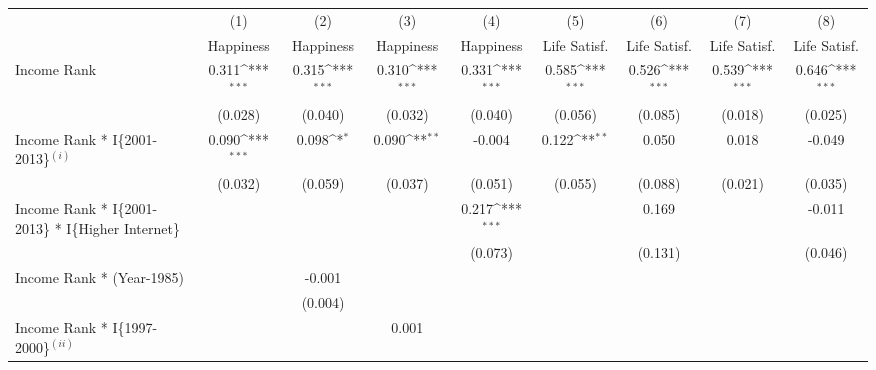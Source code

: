 \begin{table}[htb]
\resizebox{\textwidth}{!}
{
\def\sym#1{\ifmmode^{#1}\else\(^{#1}\)\fi}
\begin{tabular}{l*{8}{c}}
\toprule
                &\multicolumn{1}{c}{(1)}&\multicolumn{1}{c}{(2)}&\multicolumn{1}{c}{(3)}&\multicolumn{1}{c}{(4)}&\multicolumn{1}{c}{(5)}&\multicolumn{1}{c}{(6)}&\multicolumn{1}{c}{(7)}&\multicolumn{1}{c}{(8)}\\
                &\multicolumn{1}{c}{Happiness}&\multicolumn{1}{c}{Happiness}&\multicolumn{1}{c}{Happiness}&\multicolumn{1}{c}{Happiness}&\multicolumn{1}{c}{Life Satisf.}&\multicolumn{1}{c}{Life Satisf.}&\multicolumn{1}{c}{Life Satisf.}&\multicolumn{1}{c}{Life Satisf.}\\
\midrule
Income Rank     &    0.311\sym{***}&    0.315\sym{***}&    0.310\sym{***}&    0.331\sym{***}&    0.585\sym{***}&    0.526\sym{***}&    0.539\sym{***}&    0.646\sym{***}\\
                &  (0.028)         &  (0.040)         &  (0.032)         &  (0.040)         &  (0.056)         &  (0.085)         &  (0.018)         &  (0.025)         \\
Income Rank * I\{2001-2013\}$^{(i)}$&    0.090\sym{***}&    0.098\sym{*}  &    0.090\sym{**} &   -0.004         &    0.122\sym{**} &    0.050         &    0.018         &   -0.049         \\
                &  (0.032)         &  (0.059)         &  (0.037)         &  (0.051)         &  (0.055)         &  (0.088)         &  (0.021)         &  (0.035)         \\
Income Rank * I\{2001-2013\} * I\{Higher Internet\}&                  &                  &                  &    0.217\sym{***}&                  &    0.169         &                  &   -0.011         \\
                &                  &                  &                  &  (0.073)         &                  &  (0.131)         &                  &  (0.046)         \\
Income Rank * (Year-1985)&                  &   -0.001         &                  &                  &                  &                  &                  &                  \\
                &                  &  (0.004)         &                  &                  &                  &                  &                  &                  \\
Income Rank * I\{1997-2000\}$^{(ii)}$&                  &                  &    0.001         &                  &                  &                  &                  &                  \\

\end{tabular}}
\end{table}
